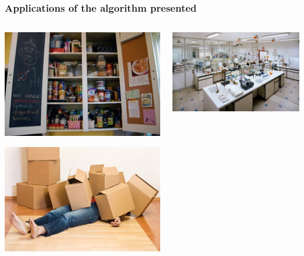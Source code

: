 \begin{frame}
  \frametitle{Applications of the algorithm presented}
  \begin{columns}
    \begin{column}{0.5\textwidth}
    \includegraphics[width=\textwidth]{img/cupboard.jpg}

    \includegraphics[width=\textwidth]{img/boxes.jpg}
    \end{column}
    \begin{column}{0.5\textwidth}
    \includegraphics[width=\textwidth]{img/laboratory.jpg}


\end{column}
\end{columns}
\end{frame}
